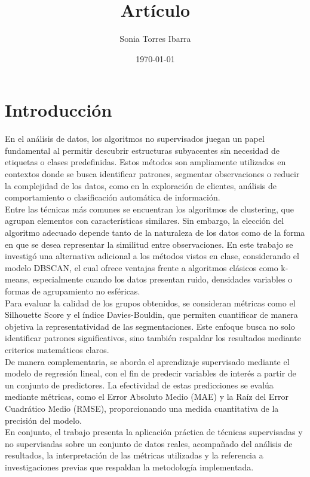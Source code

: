 \documentclass{article}
\title{Artículo}
\author{Sonia Torres Ibarra}
\date{\today}
\begin{document}
\maketitle

\section{Introducción}

En el análisis de datos, los algoritmos no supervisados juegan un papel fundamental al permitir descubrir estructuras subyacentes sin necesidad de etiquetas o clases predefinidas. Estos métodos son ampliamente utilizados en contextos donde se busca identificar patrones, segmentar observaciones o reducir la complejidad de los datos, como en la exploración de clientes, análisis de comportamiento o clasificación automática de información.\\

Entre las técnicas más comunes se encuentran los algoritmos de clustering, que agrupan elementos con características similares. Sin embargo, la elección del algoritmo adecuado depende tanto de la naturaleza de los datos como de la forma en que se desea representar la similitud entre observaciones. En este trabajo se investigó una alternativa adicional a los métodos vistos en clase, considerando el modelo DBSCAN, el cual ofrece ventajas frente a algoritmos clásicos como k-means, especialmente cuando los datos presentan ruido, densidades variables o formas de agrupamiento no esféricas.\\

Para evaluar la calidad de los grupos obtenidos, se consideran métricas como el Silhouette Score y el índice Davies-Bouldin, que permiten cuantificar de manera objetiva la representatividad de las segmentaciones. Este enfoque busca no solo identificar patrones significativos, sino también respaldar los resultados mediante criterios matemáticos claros.\\

De manera complementaria, se aborda el aprendizaje supervisado mediante el modelo de regresión lineal, con el fin de predecir variables de interés a partir de un conjunto de predictores. La efectividad de estas predicciones se evalúa mediante métricas, como el Error Absoluto Medio (MAE) y la Raíz del Error Cuadrático Medio (RMSE), proporcionando una medida cuantitativa de la precisión del modelo.\\

En conjunto, el trabajo presenta la aplicación práctica de técnicas supervisadas y no supervisadas sobre un conjunto de datos reales, acompañado del análisis de resultados, la interpretación de las métricas utilizadas y la referencia a investigaciones previas que respaldan la metodología implementada.
\clearpage
\end{document}

